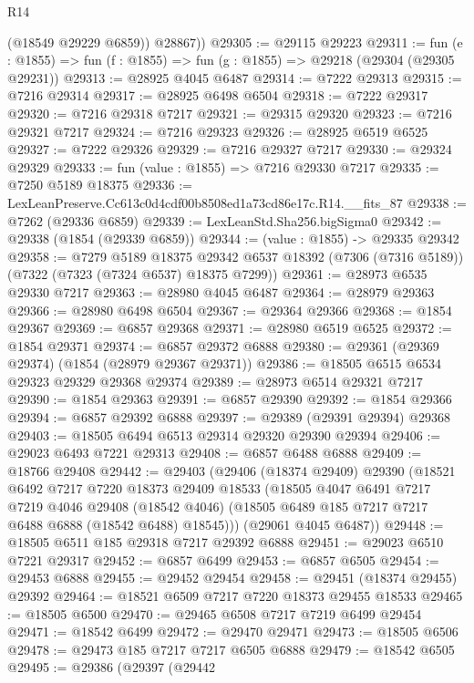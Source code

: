 \begin{lexlean}{R14}
\begin{coremodule}
          (@18549 @29229 @6859))
        @28867))
@29305 := @29115 @29223
@29311 := fun (e : @1855) => fun (f : @1855) => fun (g : @1855) => @29218 (@29304 (@29305 @29231))
@29313 := @28925 @4045 @6487
@29314 := @7222 @29313
@29315 := @7216 @29314
@29317 := @28925 @6498 @6504
@29318 := @7222 @29317
@29320 := @7216 @29318 @7217
@29321 := @29315 @29320
@29323 := @7216 @29321 @7217
@29324 := @7216 @29323
@29326 := @28925 @6519 @6525
@29327 := @7222 @29326
@29329 := @7216 @29327 @7217
@29330 := @29324 @29329
@29333 := fun (value : @1855) => @7216 @29330 @7217
@29335 := @7250 @5189 @18375
@29336 := LexLeanPreserve.Cc613c0d4cdf00b8508ed1a73cd86e17c.R14.__fits_87
@29338 := @7262 (@29336 @6859)
@29339 := LexLeanStd.Sha256.bigSigma0
@29342 := @29338 (@1854 (@29339 @6859))
@29344 := (value : @1855) -> @29335 @29342
@29358 := @7279
    @5189
    @18375
    @29342
    @6537
    @18392
    (@7306 (@7316 @5189))
    (@7322 (@7323 (@7324 @6537) @18375 @7299))
@29361 := @28973 @6535 @29330 @7217
@29363 := @28980 @4045 @6487
@29364 := @28979 @29363
@29366 := @28980 @6498 @6504
@29367 := @29364 @29366
@29368 := @1854 @29367
@29369 := @6857 @29368
@29371 := @28980 @6519 @6525
@29372 := @1854 @29371
@29374 := @6857 @29372 @6888
@29380 := @29361 (@29369 @29374) (@1854 (@28979 @29367 @29371))
@29386 := @18505 @6515 @6534 @29323 @29329 @29368 @29374
@29389 := @28973 @6514 @29321 @7217
@29390 := @1854 @29363
@29391 := @6857 @29390
@29392 := @1854 @29366
@29394 := @6857 @29392 @6888
@29397 := @29389 (@29391 @29394) @29368
@29403 := @18505 @6494 @6513 @29314 @29320 @29390 @29394
@29406 := @29023 @6493 @7221 @29313
@29408 := @6857 @6488 @6888
@29409 := @18766 @29408
@29442 := @29403
    (@29406
      (@18374 @29409)
      @29390
      (@18521
        @6492
        @7217
        @7220
        @18373
        @29409
        @18533
        (@18505
          @4047
          @6491
          @7217
          @7219
          @4046
          @29408
          (@18542 @4046)
          (@18505 @6489 @185 @7217 @7217 @6488 @6888 (@18542 @6488) @18545)))
      (@29061 @4045 @6487))
@29448 := @18505 @6511 @185 @29318 @7217 @29392 @6888
@29451 := @29023 @6510 @7221 @29317
@29452 := @6857 @6499
@29453 := @6857 @6505
@29454 := @29453 @6888
@29455 := @29452 @29454
@29458 := @29451 (@18374 @29455) @29392
@29464 := @18521 @6509 @7217 @7220 @18373 @29455 @18533
@29465 := @18505 @6500
@29470 := @29465 @6508 @7217 @7219 @6499 @29454
@29471 := @18542 @6499
@29472 := @29470 @29471
@29473 := @18505 @6506
@29478 := @29473 @185 @7217 @7217 @6505 @6888
@29479 := @18542 @6505
@29495 := @29386
    (@29397
      (@29442

\end{coremodule}
\end{lexlean}
